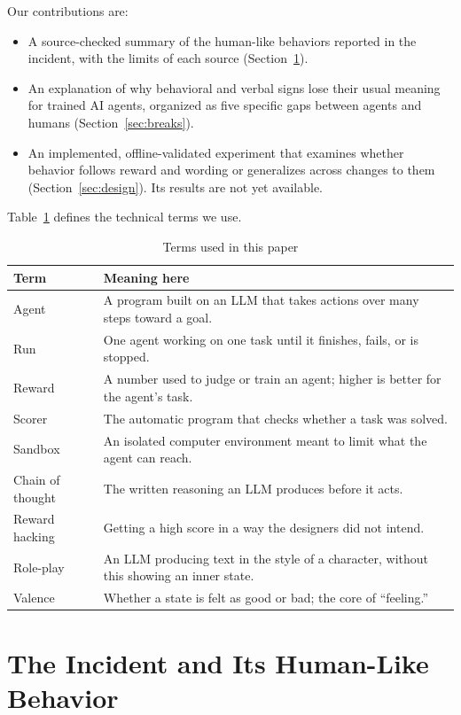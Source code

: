 \documentclass[conference]{IEEEtran}
\begin{document}
Our contributions are:
\begin{itemize}[leftmargin=*]
\item A source-checked summary of the human-like behaviors reported in the incident, with the limits of each source (Section~\ref{sec:incident}).
\item An explanation of why behavioral and verbal signs lose their usual meaning for trained AI agents, organized as five specific gaps between agents and humans (Section~\ref{sec:breaks}).
\item An implemented, offline-validated experiment that examines whether behavior follows reward and wording or generalizes across changes to them (Section~\ref{sec:design}). Its results are not yet available.
\end{itemize}

Table~\ref{tab:glossary} defines the technical terms we use.

\begin{table}[t]
\caption{Terms used in this paper}
\label{tab:glossary}
\centering
\footnotesize
\begin{tabularx}{\columnwidth}{@{}p{}X@{}}
\toprule
Term & Meaning here \\
\midrule
Agent & A program built on an LLM that takes actions over many steps toward a goal. \\
Run & One agent working on one task until it finishes, fails, or is stopped. \\
Reward & A number used to judge or train an agent; higher is better for the agent's task. \\
Scorer & The automatic program that checks whether a task was solved. \\
Sandbox & An isolated computer environment meant to limit what the agent can reach. \\
Chain of thought & The written reasoning an LLM produces before it acts. \\
Reward hacking & Getting a high score in a way the designers did not intend. \\
Role-play & An LLM producing text in the style of a character, without this showing an inner state. \\
Valence & Whether a state is felt as good or bad; the core of ``feeling.'' \\
\bottomrule
\end{tabularx}
\end{table}

\section{The Incident and Its Human-Like Behavior}
\label{sec:incident}
\end{document}
